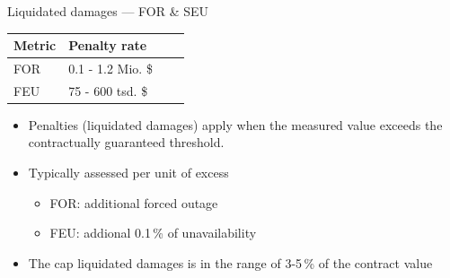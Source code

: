 \begin{frame}{Liquidated damages — FOR \& SEU}
  \centering
  \renewcommand{\arraystretch}{1.4}
  \begin{tabular}{llcc}
    \toprule
    \textbf{Metric} & \textbf{Penalty rate}\\
    \midrule
    FOR & 0.1 - 1.2 Mio. \$\\
    FEU & 75 - 600 tsd. \$\\
    \bottomrule
  \end{tabular}

  \vspace{1em}
  \begin{itemize}
    \setlength{\itemsep}{0.3em}
    \item Penalties (liquidated damages) apply when the measured value exceeds the contractually guaranteed threshold.
    \item Typically assessed per unit of excess
    \begin{itemize}
      \item FOR: additional forced outage
      \item FEU: addional 0.1\,\% of unavailability
    \end{itemize}
    \item The cap liquidated damages is in the range of 3-5\,\% of the contract value
  \end{itemize}

\end{frame}





